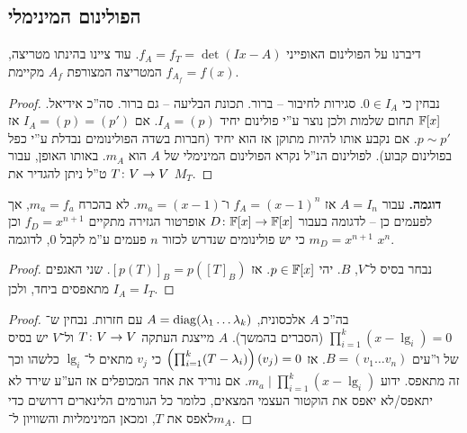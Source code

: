 \documentclass[name=רשימות אלגברה לינארית 2א]{../../../tex/classes/megasumPreamble}
\begin{document}
	\subsection{הפולינום המינימלי}
	
	דיברנו על הפולינום האופייני $f_A = f_T = \det(Ix - A)$. עוד ציינו בהינתו מטריצה, המטריצה המצורפת $A_f$ מקיימת $f_{A_f} = f(x)$. 
	
	
	\begin{proof}
		נבחין כי $0 \in I_A$. סגירות לחיבור – ברור. תכונת הבליעה – גם ברור. סה''כ אידיאל. 
		$\mathbb{F}[x]$ תחום שלמות ולכן נוצר ע''י פולינום יחיד $I_A = (p)$. אם $I_A = (p) = (p')$ אז $p \sim p'$. אם נקבע אותו להיות מתוקן אז הוא יחיד (חברות בשדה הפולינומים נבדלת ע''י כפל בפולינום קבוע).  לפולינום הנ''ל נקרא הפולינום המינימלי של $A$ הוא $m_A$. באותו האופן, עבור $T \colon V \to V$ ט''ל ניתן להגדיר את $M_T$. 
	\end{proof}
	
	
	
	
	\textbf{דוגמה. }עבור $A = I_n$ אז $f_A = (x - 1)^{n}$ ו־$m_a = (x - 1)$. לא בהכרח $m_a = f_a$, אך לפעמים כן – לדגומה בעבור $D \colon \mathbb{F}[x] \to \mathbb{F}[x]$ אופרטור הגזירה מתקיים $f_D = x^{n + 1}$ וכן $m_D = x^{n + 1}$ כי יש פולינומים שנדרש לכזור $n$ פעמים ע''מ לקבל $0$, לדוגמה $x^{n}$. 
	
	\begin{proof}
		נבחר בסיס ל־$V$, $B$. יהי $p \in \mathbb{F}[x]$. אז $[p(T)]_B = p([T]_B)$. שני האגפים מתאפסים ביחד, ולכן $I_A = I_T$. 
	\end{proof}
	
	\begin{proof}
		בה''כ $A$ אלכסונית, $A = \operatorname{diag}(\lambda_1 \dots \lambda_k)$ עם חזרות. נבחין ש־$\prod_{i = 1}^{k} (x - \lg_i) = 0$ (הסברים בהמשך). $A$ מייצגת העתקה $T \colon V \to V$ ול־$V$ יש בסיס של ו''עים $B = (v_1 \dots v_n)$.  אז $\left ( \prod_{i = 1}^{k}(T - \lambda_i) \right )(v_j) = 0$ כי $v_j$ מתאים ל־$\lg_i$ כלשהו וכך זה מתאפס. ידוע $m_a \mid \prod_{i = 1}^{k}(x - \lg_i)$. אם נוריד את אחד המכופלים אז הע''ע שירד לא יתאפס/לא יאפס את הוקטור העצמי המצאים, כלומר כל הגורמים הלינארים דרושים כדי לאפס את $T$, ומכאן המינימליות והשוויון ל־$m_A$. 
	\end{proof}
	
\end{document}
